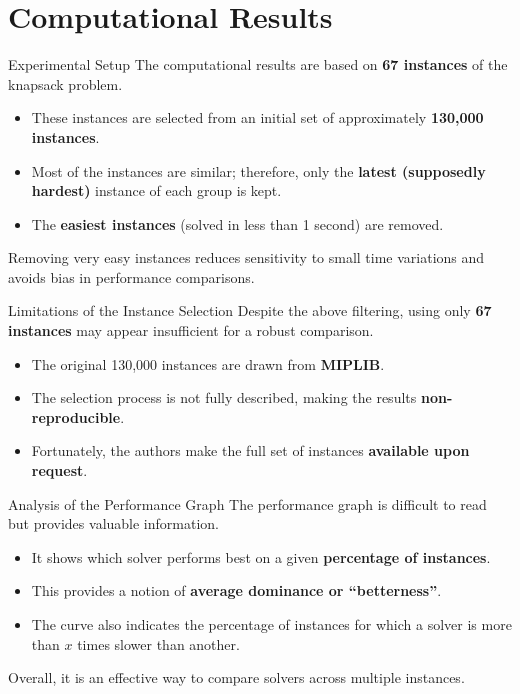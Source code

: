 \documentclass[aspectratio=169,xcolor=dvipsnames]{beamer}
\begin{document}
\section{Computational Results}

\begin{frame}{Experimental Setup}
The computational results are based on \textbf{67 instances} of the knapsack problem.

\begin{itemize}
    \item These instances are selected from an initial set of approximately \textbf{130,000 instances}.
    \item Most of the instances are similar; therefore, only the \textbf{latest (supposedly hardest)} instance of each group is kept.
    \item The \textbf{easiest instances} (solved in less than 1 second) are removed.
\end{itemize}

\medskip
Removing very easy instances reduces sensitivity to small time variations and avoids bias in performance comparisons.
\end{frame}

\begin{frame}{Limitations of the Instance Selection}
Despite the above filtering, using only \textbf{67 instances} may appear insufficient for a robust comparison.

\begin{itemize}
    \item The original 130,000 instances are drawn from \textbf{MIPLIB}.
    \item The selection process is not fully described, making the results \textbf{non-reproducible}.
    \item Fortunately, the authors make the full set of instances \textbf{available upon request}.
\end{itemize}
\end{frame}

\begin{frame}{Analysis of the Performance Graph}
The performance graph is difficult to read but provides valuable information.

\begin{itemize}
    \item It shows which solver performs best on a given \textbf{percentage of instances}.
    \item This provides a notion of \textbf{average dominance or “betterness”}.
    \item The curve also indicates the percentage of instances for which a solver is more than $x$ times slower than another.
\end{itemize}

Overall, it is an effective way to compare solvers across multiple instances.
\end{frame}
\end{document}
